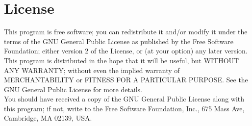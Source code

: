 \hypertarget{License}{
\section{License}
\label{License}
}


    This program is free software; you can redistribute it and/or modify
    it under the terms of the GNU General Public License as published by
    the Free Software Foundation; either version 2 of the License, or
    (at your option) any later version.\\

    This program is distributed in the hope that it will be useful,
    but WITHOUT ANY WARRANTY; without even the implied warranty of
    MERCHANTABILITY or FITNESS FOR A PARTICULAR PURPOSE.  See the
    GNU General Public License for more details.\\

    You should have received a copy of the GNU General Public License
    along with this program; if not, write to the Free Software
    Foundation, Inc., 675 Mass Ave, Cambridge, MA 02139, USA.
    